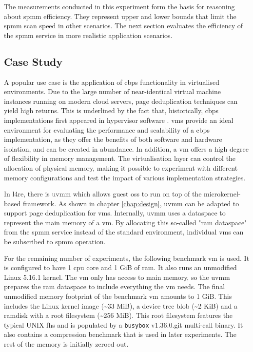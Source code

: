 The measurements conducted in this experiment form the basis for reasoning about \ac{spmm} efficiency.
They represent upper and lower bounds that limit the \ac{spmm} scan speed in other scenarios.
The next section evaluates the efficiency of the \ac{spmm} service in more realistic application scenarios.

\subsection{Case Study}
\label{subsec:case-study}

A popular use case is the application of \ac{cbps} functionality in virtualised environments.
Due to the large number of near-identical virtual machine instances running on modern cloud servers, page deduplication techniques can yield high returns.
This is underlined by the fact that, historically, \ac{cbps} implementations first appeared in hypervisor software \cite{vmware-tps-patent}.
\Acp{vm} provide an ideal environment for evaluating the performance and scalability of a \ac{cbps} implementation, as they offer the benefits of both software and hardware isolation, and can be created in abundance.
In addition, a \ac{vm} offers a high degree of flexibility in memory management.
The virtualisation layer can control the allocation of physical memory, making it possible to experiment with different memory configurations and test the impact of various implementation strategies.

In \ac{l4re}, there is \ac{uvmm} which allows guest \acp{os} to run on top of the microkernel-based framework.
As shown in chapter \ref{chap:design}, \ac{uvmm} can be adapted to support page deduplication for \acp{vm}.
Internally, \ac{uvmm} uses a dataspace to represent the main memory of a \ac{vm}.
By allocating this so-called "\acs{ram} dataspace" from the \ac{spmm} service instead of the standard environment, individual \acp{vm} can be subscribed to \ac{spmm} operation.

For the remaining number of experiments, the following benchmark \ac{vm} is used.
It is configured to have 1 \ac{cpu} core and 1 GiB of \ac{ram}.
It also runs an unmodified Linux 5.16.1 kernel.
The \ac{vm} only has access to main memory, so the \ac{uvmm} prepares the \ac{ram} dataspace to include everything the \ac{vm} needs.
The final unmodified memory footprint of the benchmark \ac{vm} amounts to 1 GiB.
This includes the Linux kernel image (\textasciitilde{}33 MiB), a device tree blob (\textasciitilde{}2 KiB) and a ramdisk with a root filesystem (\textasciitilde{}256 MiB).
This root filesystem features the typical UNIX \ac{fhs} and is populated by a \texttt{busybox} v1.36.0.git multi-call binary.
It also contains a compression benchmark that is used in later experiments.
The rest of the memory is initially zeroed out.


